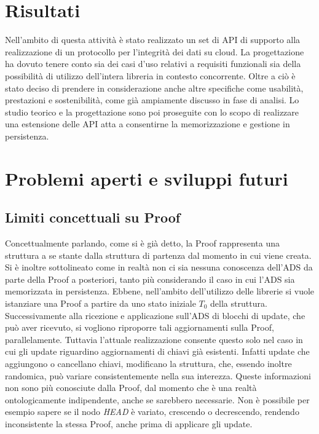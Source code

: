 \section{Risultati}


	Nell'ambito di questa attività è stato realizzato un set di API di supporto alla realizzazione di un protocollo per l'integrità dei dati su cloud. La progettazione ha dovuto tenere conto sia dei casi d'uso relativi a requisiti funzionali sia della possibilità di utilizzo dell'intera libreria in contesto concorrente. Oltre a ciò è stato deciso di prendere in considerazione anche altre specifiche come usabilità, prestazioni e sostenibilità, come già ampiamente discusso in fase di analisi. Lo studio teorico e la progettazione sono poi proseguite con lo scopo di realizzare una estensione delle API atta a consentirne la memorizzazione e gestione in persistenza.

\section{Problemi aperti e sviluppi futuri}

	\subsection{Limiti concettuali su Proof}
	

		Concettualmente parlando, come si è già detto, la Proof rappresenta una struttura a se stante dalla struttura di partenza dal momento in cui viene creata. Si è inoltre sottolineato come in realtà non ci sia nessuna conoscenza dell'ADS da parte della Proof a posteriori, tanto più considerando il caso in cui l'ADS sia memorizzata in persistenza.
		Ebbene, nell'ambito dell'utilizzo delle librerie si vuole istanziare una Proof a partire da uno stato iniziale $ T_{0} $ della struttura. Successivamente alla ricezione e applicazione sull'ADS di blocchi di update, che può aver ricevuto, si vogliono riproporre tali aggiornamenti sulla Proof, parallelamente. Tuttavia l'attuale realizzazione consente questo solo nel caso in cui gli update riguardino aggiornamenti di chiavi già esistenti. Infatti update che aggiungono o cancellano chiavi, modificano la struttura, che, essendo inoltre randomica, può variare consistentemente nella sua interezza. Queste informazioni non sono più conosciute dalla Proof, dal momento che è una realtà ontologicamente indipendente, anche se sarebbero necessarie. Non è possibile per esempio sapere se il nodo \textit{HEAD} è variato, crescendo o decrescendo, rendendo inconsistente la stessa Proof, anche prima di applicare gli update.
	
